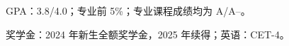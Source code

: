 
\begin{ResumeItemize}
  \item GPA：3.8/4.0；专业前 5\%；专业课程成绩均为 A/A--。
  \item 奖学金：2024 年新生全额奖学金，2025 年续得；英语：CET-4。
\end{ResumeItemize}
